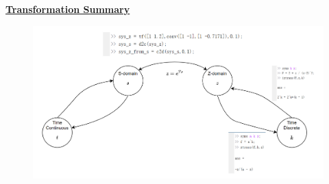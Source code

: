 \textbf{\underline{Transformation Summary}}
\begin{figure}[h]
    \centering
    \includegraphics[width=1.0\linewidth]{images/transformation_Summary.png}
\end{figure}